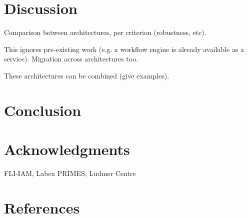 \documentclass[preprint,3p,twocolumn]{elsarticle}
\begin{document}
\section{Discussion}

Comparison between architectures, per criterion (robustness, etc).

This ignores pre-existing work (e.g. a workflow engine is already available as a service). Migration across architectures too.

These architectures can be combined (give examples). 

\section{Conclusion}

\section{Acknowledgments}

FLI-IAM, Labex PRIMES, Ludmer Centre

\section*{References}

 

\end{document}
